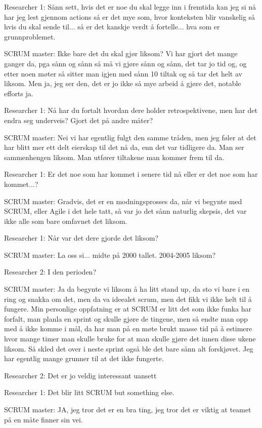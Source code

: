 Researcher 1: Sånn sett, hvis det er noe du skal legge inn i fremtida kan jeg si nå har jeg lest gjennom actions så er det mye som, hvor konteksten blir vanskelig så hvis du skal sende til... så er det kanskje verdt å fortelle... hva som er grunnproblemet. 

SCRUM master: Ikke bare det du skal gjør liksom? Vi har gjort det mange ganger da, pga sånn og sånn så må vi gjøre sånn og sånn, det tar jo tid og, og etter noen møter så sitter man igjen med sånn 10 tiltak og så tar det helt av liksom. Men ja, jeg ser den, det er jo ikke så mye arbeid å gjøre det, notable efforts ja. 

Researcher 1: Nå har du fortalt hvordan dere holder retrospektivene, men har det endra seg underveis? Gjort det på andre måter?

SCRUM master: Nei vi har egentlig fulgt den samme tråden, men jeg føler at det har blitt mer ett delt eierskap til det nå da, enn det var tidligere da. Man ser sammenhengen liksom. Man utfører tiltakene man kommer frem til da.

Researcher 1: Er det noe som har kommet i senere tid nå eller er det noe som har kommet...?

SCRUM master: Gradvis, det er en modningsprosses da, når vi begynte med SCRUM, eller Agile i det hele tatt, så var jo det sånn naturlig skepsis, det var ikke alle som bare omfavnet det liksom.

Researcher 1: Når var det dere gjorde det liksom?

SCRUM master: La oss si... midte på 2000 tallet. 2004-2005 liksom?

Researcher 2: I den perioden?

SCRUM master: Ja da begynte vi liksom å ha litt stand up, da sto vi bare i en ring og snakka om det, men da va ideealet scrum, men det fikk vi ikke helt til å fungere. Min personlige oppfatning er at SCRUM er litt det som ikke funka har forfalt, man planla en sprint og skulle gjøre de tingene, men så endte man opp med å ikke komme i mål, da har man på en møte brukt masse tid på å estimere hvor mange timer man skulle bruke for at man skulle gjøre det innen disse ukene liksom. Så skled det over i neste sprint også ble det bare sånn alt forskjøvet. Jeg har egentlig mange grunner til at det ikke fungerte.

Researcher 2: Det er jo veldig interessant uansett

Researcher 1: Det blir litt SCRUM but something else.

SCRUM master: JA, jeg tror det er en bra ting, jeg tror det er viktig at teamet på en måte finner sin vei. 

